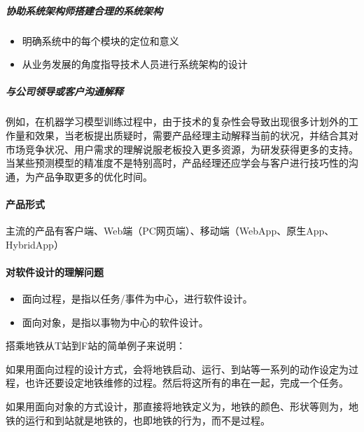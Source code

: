 \documentclass[letterpaper,10pt,english]{sphinxmanual}
\begin{document}
\subparagraph{协助系统架构师搭建合理的系统架构}
\label{\detokenize{chapter_idea/understand_tech:id7}}\begin{itemize}
\item {} 
明确系统中的每个模块的定位和意义

\item {} 
从业务发展的角度指导技术人员进行系统架构的设计

\end{itemize}


\subparagraph{与公司领导或客户沟通解释}
\label{\detokenize{chapter_idea/understand_tech:id8}}
例如，在机器学习模型训练过程中，由于技术的复杂性会导致出现很多计划外的工作量和效果，当老板提出质疑时，需要产品经理主动解释当前的状况，并结合其对市场竞争状况、用户需求的理解说服老板投入更多资源，为研发获得更多的支持。当某些预测模型的精准度不是特别高时，产品经理还应学会与客户进行技巧性的沟通，为产品争取更多的优化时间。%
\begin{footnote}[436]\sphinxAtStartFootnote
{}
%
\end{footnote}


\paragraph{产品形式}
\label{\detokenize{chapter_idea/understand_tech:id9}}
主流的产品有客户端、Web端（PC网页端）、移动端（WebApp、原生App、HybridApp）


\paragraph{对软件设计的理解问题}
\label{\detokenize{chapter_idea/understand_tech:id10}}\begin{itemize}
\item {} 
面向过程，是指以任务/事件为中心，进行软件设计。

\item {} 
面向对象，是指以事物为中心的软件设计。

\end{itemize}

搭乘地铁从T站到F站的简单例子来说明：

如果用面向过程的设计方式，会将地铁启动、运行、到站等一系列的动作设定为过程，也许还要设定地铁维修的过程。然后将这所有的串在一起，完成一个任务。

如果用面向对象的方式设计，那直接将地铁定义为，地铁的颜色、形状等则为，地铁的运行和到站就是地铁的，也即地铁的行为，而不是过程。
\end{document}
